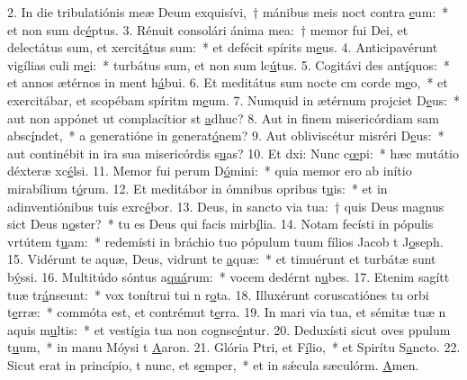 2. In die tribulatiónis meæ Deum exquisívi,~† mánibus meis noct contra \uline{e}um:~* et non sum dc\uline{é}ptus.
3. Rénuit consolári ánima mea:~† memor fui Dei, et delectátus sum, et xercit\uline{á}tus sum:~* et defécit spírits m\uline{e}us.
4. Anticipavérunt vigílias culi m\uline{e}i:~* turbátus sum, et non sum lc\uline{ú}tus.
5. Cogitávi des ant\uline{í}quos:~* et annos ætérnos in ment h\uline{á}bui.
6. Et meditátus sum nocte cm corde m\uline{e}o,~* et exercitábar, et scopébam spíritm m\uline{e}um.
7. Numquid in ætérnum projciet D\uline{e}us:~* aut non appónet ut complacítior st \uline{a}dhuc?
8. Aut in finem misericórdiam sam absc\uline{í}ndet,~* a generatióne in generat\uline{ó}nem?
9. Aut obliviscétur misréri D\uline{e}us:~* aut continébit in ira sua misericórdis s\uline{u}as?
10. Et dxi: Nunc c\uline{œ}pi:~* hæc mutátio déxteræ xc\uline{é}lsi.
11. Memor fui perum D\uline{ó}mini:~* quia memor ero ab inítio mirabílium t\uline{ó}rum.
12. Et meditábor in ómnibus opribus t\uline{u}is:~* et in adinventiónibus tuis exrc\uline{é}bor.
13. Deus, in sancto via tua:~† quis Deus magnus sict Deus n\uline{o}ster?~* tu es Deus qui facis mirb\uline{í}lia.
14. Notam fecísti in pópulis vrtútem t\uline{u}am:~* redemísti in bráchio tuo pópulum tuum fílios Jacob t J\uline{o}seph.
15. Vidérunt te aquæ, Deus, vidrunt te \uline{a}quæ:~* et timuérunt et turbátæ sunt b\uline{ý}ssi.
16. Multitúdo sóntus a\uline{quá}rum:~* vocem dedérnt n\uline{u}bes.
17. Etenim sagítt tuæ tr\uline{á}nseunt:~* vox tonítrui tui n r\uline{o}ta.
18. Illuxérunt coruscatiónes tu orbi t\uline{e}rræ:~* commóta est, et contrémut t\uline{e}rra.
19. In mari via tua, et sémitæ tuæ n aquis m\uline{u}ltis:~* et vestígia tua non cognsc\uline{é}ntur.
20. Deduxísti sicut oves ppulum t\uline{u}um,~* in manu Móysi t \uline{A}aron.
21. Glória Ptri, et F\uline{í}lio,~* et Spirítu S\uline{a}ncto.
22. Sicut erat in princípio, t nunc, et s\uline{e}mper,~* et in sǽcula sæculórm. \uline{A}men.
